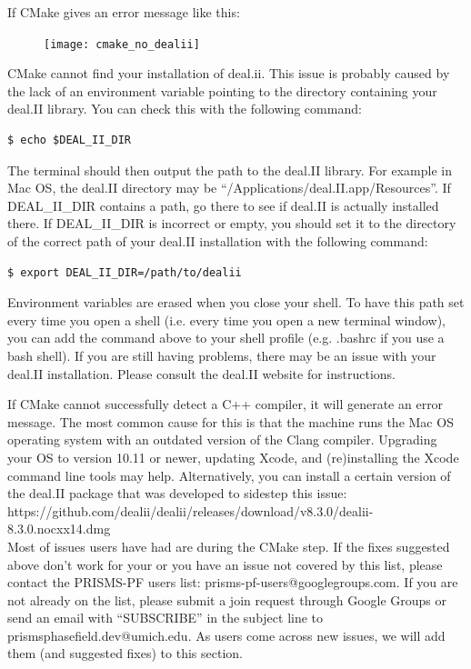 \documentclass[10pt]{article} %
\begin{document}
If CMake gives an error message like this:
\begin{figure}[H]
\vspace{-90pt}
\centering
\texttt{[image: cmake\_no\_dealii]}
\vspace{-90pt}
\end{figure}
CMake cannot find your installation of deal.ii. This issue is probably caused by the lack of an environment variable pointing to the directory containing your deal.II library. You can check this with the following command:
\begin{lstlisting}
$ echo $DEAL_II_DIR
\end{lstlisting}
The terminal should then output the path to the deal.II library. For example in Mac OS, the deal.II directory may be ``/Applications/deal.II.app/Resources''. If  DEAL\_II\_DIR contains a path, go there to see if deal.II is actually installed there. If DEAL\_II\_DIR is incorrect or empty, you should set it to the directory of the correct path of your deal.II installation with the following command:
\begin{lstlisting}
$ export DEAL_II_DIR=/path/to/dealii
\end{lstlisting}
Environment variables are erased when you close your shell. To have this path set every time you open a shell (i.e. every time you open a new terminal window), you can add the command above to your shell profile (e.g. .bashrc if you use a bash shell). If you are still having problems, there may be an issue with your deal.II installation. Please consult the deal.II website for instructions.

If CMake cannot successfully detect a C++ compiler, it will generate an error message. The most common cause for this is that the machine runs the Mac OS operating system with an outdated version of the Clang compiler. Upgrading your OS to version 10.11 or newer, updating Xcode, and (re)installing the Xcode command line tools may help. Alternatively, you can install a certain version of the deal.II package that was developed to sidestep this issue:
\\https://github.com/dealii/dealii/releases/download/v8.3.0/dealii-8.3.0.nocxx14.dmg\\

Most of issues users have had are during the CMake step. If the fixes suggested above don't work for your or you have an issue not covered by this list, please contact the PRISMS-PF users list: prisms-pf-users@googlegroups.com. If you are not already on the list, please submit a join request through Google Groups or send an email with ``SUBSCRIBE'' in the subject line to prismsphasefield.dev@umich.edu. As users come across new issues, we will add them (and suggested fixes) to this section.
\end{document}
